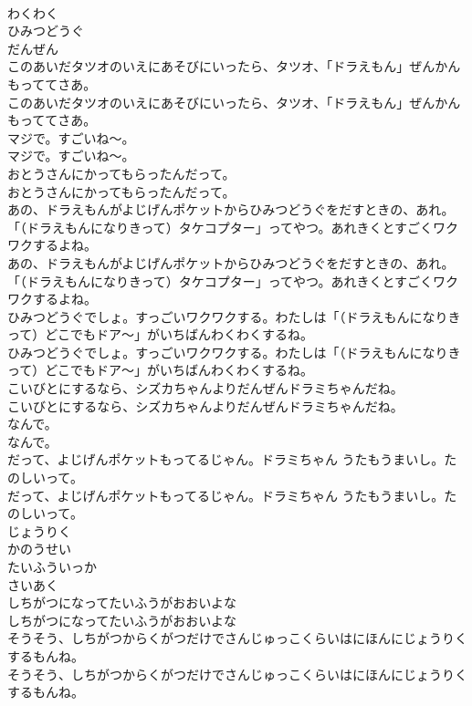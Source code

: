 \documentclass[8pt]{extreport}
\begin{document}
\begin{CJK}{UTF8}{min}
\\	わくわく
\\	ひみつどうぐ
\\	だんぜん
\\	このあいだタツオのいえにあそびにいったら、タツオ、「ドラえもん」ぜんかんもっててさあ。
\\	このあいだタツオのいえにあそびにいったら、タツオ、「ドラえもん」ぜんかんもっててさあ。
\\	マジで。すごいね～。
\\	マジで。すごいね～。
\\	おとうさんにかってもらったんだって。
\\	おとうさんにかってもらったんだって。
\\	あの、ドラえもんがよじげんポケットからひみつどうぐをだすときの、あれ。「（ドラえもんになりきって）タケコプター」ってやつ。あれきくとすごくワクワクするよね。
\\	あの、ドラえもんがよじげんポケットからひみつどうぐをだすときの、あれ。「（ドラえもんになりきって）タケコプター」ってやつ。あれきくとすごくワクワクするよね。
\\	ひみつどうぐでしょ。すっごいワクワクする。わたしは「（ドラえもんになりきって）どこでもドア～」がいちばんわくわくするね。
\\	ひみつどうぐでしょ。すっごいワクワクする。わたしは「（ドラえもんになりきって）どこでもドア～」がいちばんわくわくするね。
\\	こいびとにするなら、シズカちゃんよりだんぜんドラミちゃんだね。
\\	こいびとにするなら、シズカちゃんよりだんぜんドラミちゃんだね。
\\	なんで。
\\	なんで。
\\	だって、よじげんポケットもってるじゃん。ドラミちゃん うたもうまいし。たのしいって。
\\	だって、よじげんポケットもってるじゃん。ドラミちゃん うたもうまいし。たのしいって。
\\	じょうりく
\\	かのうせい
\\	たいふういっか
\\	さいあく
\\	しちがつになってたいふうがおおいよな
\\	しちがつになってたいふうがおおいよな
\\	そうそう、しちがつからくがつだけでさんじゅっこくらいはにほんにじょうりくするもんね。
\\	そうそう、しちがつからくがつだけでさんじゅっこくらいはにほんにじょうりくするもんね。

\end{CJK}
\end{document}
